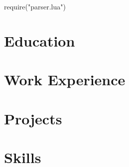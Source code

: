 \documentclass[letterpaper,10pt]{article}
\begin{document}
\begin{luacode}
require("parser.lua")
\end{luacode}



\section{Education}
  \resumeSubHeadingListStart
  
  \resumeSubHeadingListEnd

\section{Work Experience}
  \resumeSubHeadingListStart
  	
  \resumeSubHeadingListEnd

\section{{Projects}}
  \resumeSubHeadingListStart
    
  \resumeSubHeadingListEnd
  
\section{Skills}
  \resumeSubHeadingListStart 
  
  \resumeSubHeadingListEnd

\end{document}
